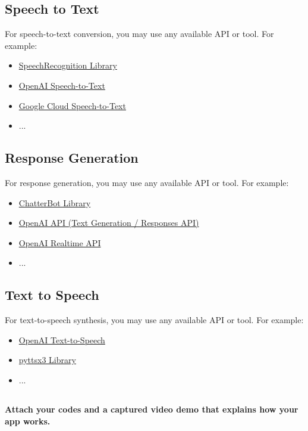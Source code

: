 \documentclass{article}
\begin{document}
\subsection*{Speech to Text}
For speech-to-text conversion, you may use any available API or tool. For example:
\begin{itemize}
    \item \href{https://pypi.org/project/SpeechRecognition/}{SpeechRecognition Library}
    \item \href{https://developers.openai.com/api/docs/guides/speech-to-text}{OpenAI Speech-to-Text}
    \item \href{https://docs.cloud.google.com/speech-to-text/docs}{Google Cloud Speech-to-Text}
    \item ...
\end{itemize}

\subsection*{Response Generation}
For response generation, you may use any available API or tool. For example:
\begin{itemize}
    \item \href{https://docs.chatterbot.us/}{ChatterBot Library}
    \item \href{https://developers.openai.com/api/docs/guides/text}{OpenAI API (Text Generation / Responses API)}
    \item \href{https://developers.openai.com/api/docs/guides/realtime}{OpenAI Realtime API}
    \item ...
\end{itemize}

\subsection*{Text to Speech}
For text-to-speech synthesis, you may use any available API or tool. For example:
\begin{itemize}
    \item \href{https://developers.openai.com/api/docs/guides/text-to-speech}{OpenAI Text-to-Speech}
    \item \href{https://pypi.org/project/pyttsx3/}{pyttsx3 Library}
    \item ...
\end{itemize}

\subsection*{}
\textbf{Attach your codes and a captured video demo that explains how your app works.}


\vspace{0.8em}
\end{document}

